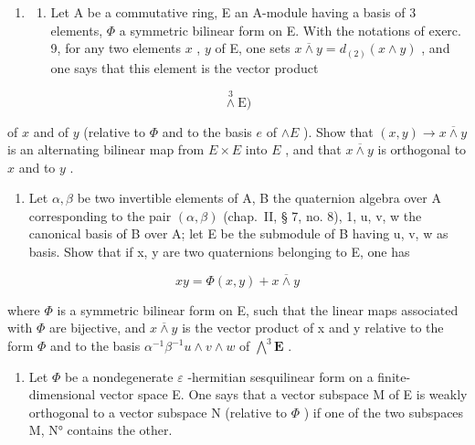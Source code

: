 \begin{enumerate}
\def\labelenumi{\arabic{enumi})}
\setcounter{enumi}{9}
\tightlist
\item
  \begin{enumerate}
  \def\labelenumii{\alph{enumii})}
  \tightlist
  \item
    Let A be a commutative ring, E an A-module having a basis of 3 elements, \(\Phi\) a symmetric bilinear form on E. With the notations of exerc. 9, for any two elements \(x\) , \(y\) of E, one sets \(x \overline{\wedge} y = d_{(2)}(x \wedge y)\) , and one says that this element is the vector product
  \end{enumerate}
\end{enumerate}

\[
\stackrel {{3}} {\wedge} \mathrm{E})
\]

of \(x\) and of \(y\) (relative to \(\Phi\) and to the basis \(e\) of \(\wedge E\) ). Show that \((x, y) \to x \overline{\wedge} y\) is an alternating bilinear map from \(E \times E\) into \(E\) , and that \(x \overline{\wedge} y\) is orthogonal to \(x\) and to \(y\) .

\begin{enumerate}
\def\labelenumi{\alph{enumi})}
\setcounter{enumi}{1}
\tightlist
\item
  Let \(\alpha, \beta\) be two invertible elements of A, B the quaternion algebra over A corresponding to the pair \((\alpha, \beta)\) (chap.~II, § 7, no. 8), 1, u, v, w the canonical basis of B over A; let E be the submodule of B having u, v, w as basis. Show that if x, y are two quaternions belonging to E, one has
\end{enumerate}

\[
x y = \Phi (x, y) + x \overline {{{{\wedge}}}} y
\]

where \(\Phi\) is a symmetric bilinear form on E, such that the linear maps associated with \(\Phi\) are bijective, and \(x\overline{\wedge}y\) is the vector product of x and y relative to the form \(\Phi\) and to the basis \(\alpha^{-1}\beta^{-1}u\wedge v\wedge w\) of \(\bigwedge^{3}\mathbf{E}\) .

\begin{enumerate}
\def\labelenumi{\arabic{enumi})}
\setcounter{enumi}{10}
\tightlist
\item
  Let \(\Phi\) be a nondegenerate \(\varepsilon\) -hermitian sesquilinear form on a finite-dimensional vector space E. One says that a vector subspace M of E is weakly orthogonal to a vector subspace N (relative to \(\Phi\) ) if one of the two subspaces M, N° contains the other.
\end{enumerate}

